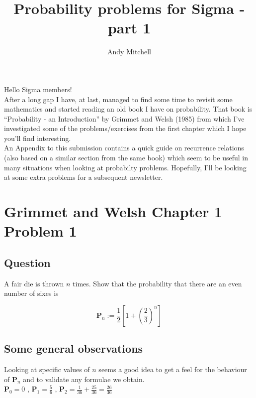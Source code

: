 \documentclass[a4paper,10pt]{article}
\author{Andy Mitchell}
\title{Probability problems for Sigma - part 1}
\begin{document}
 
\maketitle 
\begin{flushleft} 
Hello Sigma members! \\
After a long gap I have, at last, managed to find some time to revisit some mathematics and started reading an old book I have on probability. 
That book is ``Probability - an Introduction'' by Grimmet and Welsh (1985) from which I've investigated some of the problems/exercises from the first chapter which I hope you'll find interesting.\\

An Appendix to this submission contains a quick guide on recurrence relations (also based on a similar section from the same book) which seem to be useful 
in many situations when looking at probabilty problems.
Hopefully, I'll be looking at some extra problems for a subsequent newsletter.

\section{Grimmet and Welsh Chapter 1 Problem 1}
\subsection{Question}

A fair die is thrown $n$ times. Show that the probability that there are an even number of sixes is 
 
\begin{equation*} 
\mathbf{P}_n := \frac{1}{2}\left[1 + \left({\frac{2}{3}}\right)^n\right] 
\end{equation*}

\subsection{Some general observations}
Looking at specific values of $n$ seems a good idea to get a feel for the behaviour of $\mathbf{P}_n$ and to validate any formulae we obtain. \\
$\mathbf{P}_0 = 0$ ,
$\mathbf{P}_1 = \frac{5}{6}$ ,
$\mathbf{P}_2 = \frac{1}{36} + \frac{25}{36} = \frac{26}{36}$ \\


\end{flushleft}
\end{document}

